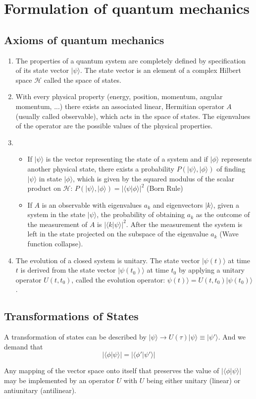 \chapter{Formulation of quantum mechanics}
\section{Axioms of quantum mechanics}
\begin{enumerate}
\item  The properties of a quantum system are completely defined by specification of its state vector $|\psi\rangle$. The state vector is an element of a complex Hilbert space $\mathcal{H}$ called the space of states.
\item With every physical property (energy, position, momentum, angular momentum, ...) there exists an associated linear, Hermitian operator $A$ (usually called observable), which acts in the space of states. The eigenvalues of the operator are the possible values of the physical properties.
\item 
\begin{itemize}
\item  If $|\psi\rangle$ is the vector representing the state of a system and if $|\phi\rangle$ represents another physical state, there exists a probability $P(|\psi\rangle,|\phi\rangle)$ of finding $|\psi\rangle$ in state $|\phi\rangle$, which is given by the squared modulus of the scalar product on $\mathcal{H}: \, P(|\psi\rangle,|\phi\rangle) = |\langle \psi | \phi \rangle|^2$ (Born Rule)
\item If $A$ is an observable with eigenvalues $a_k$ and eigenvectors $|k\rangle$, given a system in the state $|\psi\rangle$, the probability of obtaining $a_k$ as the outcome of the measurement of $A$ is $|\langle k | \psi \rangle|^2$. After the measurement
the system is left in the state projected on the subspace of the eigenvalue $a_k$ (Wave function collapse).
\end{itemize}
\item The evolution of a closed system is unitary. The state vector $|\psi(t)\rangle$ at time $t$ is derived from the state vector $|\psi(t_0)\rangle$ at time $t_0$ by applying a unitary operator $U(t,t_0)$, called the evolution operator: $\psi(t)\rangle = U(t,t_0) |\psi(t_0)\rangle$.
\end{enumerate}

\section{Transformations of States}
A transformation of states can be described by $|\psi\rangle \to U(\tau) | \psi \rangle \equiv | \psi' \rangle$. And we demand that
\[|\langle \phi | \psi \rangle| = |\langle \phi' | \psi' \rangle|\]
\begin{newthem}
Any mapping of the vector space onto itself that preserves the value of $|\langle \phi | \psi \rangle|$ may be implemented by an operator $U$ with $U$ being either unitary (linear) or antiunitary (antilinear).
\end{newthem}


